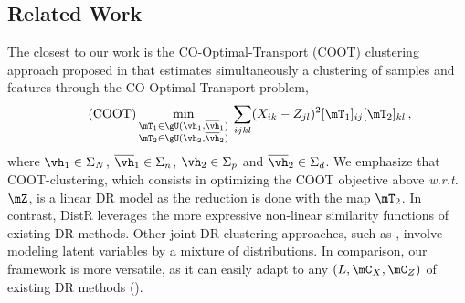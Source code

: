 \subsection{Related Work}\label{sec:related_work}

The closest to our work is the CO-Optimal-Transport (COOT) clustering approach proposed in \citep{redko2020co} that estimates simultaneously a clustering of samples and features through the CO-Optimal Transport problem,
\begin{align}\tag{COOT}
	\label{eq:coot_pb}
	\min_{\substack{\mT_1 \in \gU(\vh_1, \overline{\vh}_1) \\ \mT_2 \in \gU(\vh_2, \overline{\vh}_2)}} \: \sum_{ijkl} (X_{ik} - Z_{jl})^2 [\mT_1]_{ij} [\mT_2]_{kl} \,,
\end{align}
where $\vh_1 \in \Sigma_N$, $\overline{\vh}_1 \in \Sigma_n$, $\vh_2 \in \Sigma_p$ and $\overline{\vh}_2 \in \Sigma_d$.
We emphasize that COOT-clustering, which consists in optimizing the COOT objective
above \emph{w.r.t.} $\mZ$, is a linear DR model as the reduction is done with the map $\mT_2$. In contrast, DistR
leverages the more expressive non-linear similarity functions of existing DR
methods. Other joint DR-clustering approaches, such as \citep{liu2022joint},
involve modeling latent variables by a mixture of distributions. In comparison,
our framework is more versatile, as it can easily adapt to any $(L, \mC_X,
\mC_Z)$ of existing DR methods ().

